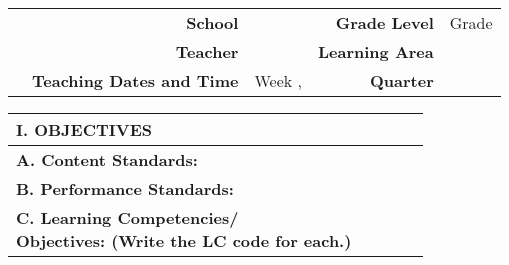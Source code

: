 



\begin{center}

{
\setlength\arrayrulewidth{2pt}
\begin{tabularx}{\textwidth}{|Y|R|L|R|L|}

\hline

& 	
\textbf{School}  & 
\School & 	
\textbf{Grade Level} & 
Grade \Grade 
\\


& \textbf{Teacher} 
& \Teacher 
& \textbf{Learning Area} 
& \Subject \\


& \textbf{Teaching Dates and Time} 
& Week \WeekNum, \LessonWeek 
& \textbf{Quarter} 
& \Quarter \\

\hline

\end{tabularx} 
}


\begin{longtable}{|p{161pt}|p{161pt}|p{161pt}|p{161pt}|p{161pt}|}

\hline

\textbf{I. OBJECTIVES } & 	
\thead{DAY 1}  & 
\thead{DAY 2}  & 	
\thead{DAY 3}  & 
\thead{DAY 4}  \\

\hline

\hspce \textbf{A. Content Standards:}  	
& 
\ContentStandards
\\ 

\hline 

\hspce \textbf{B. Performance Standards:}  	
& 
\PerformanceStandards
\\ 
\hline 

\hspce \textbf{C. Learning Competencies/ \newline Objectives: (Write the LC code for each.) }
&	

\if \LessonA1 
\LearningCompetenciesDayA
\fi 
\if \LessonB1 
\LearningCompetenciesDayB
\fi 
\if \LessonC1 
\LearningCompetenciesDayC
\fi 
\if \LessonD1 
\LearningCompetenciesDayD
\fi 


\end{longtable}
\end{center}

